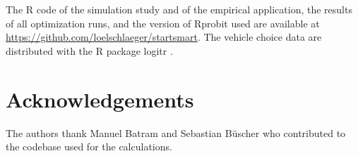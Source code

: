 \documentclass[preprint,12pt,authoryear]{elsarticle}
\begin{document}
The R code of the simulation study and of the empirical application, the results of all optimization runs, and the version of Rprobit used are available at \url{https://github.com/loelschlaeger/startsmart}. The vehicle choice data are distributed with the R package logitr \citep{Helveston2023}.

\section*{Acknowledgements}

The authors thank Manuel Batram and Sebastian Büscher who contributed to the codebase used for the calculations.



\end{document}
